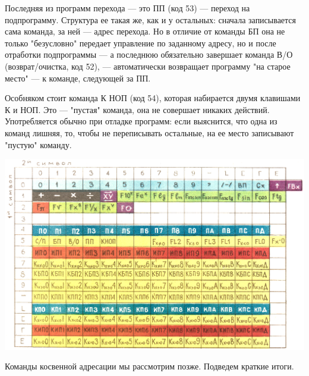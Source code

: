 \documentclass[11pt,a4paper,oneside]{article}
\begin{document}
Последняя из программ перехода — это ПП (код 53) — переход на подпрограмму. Структура ее такая же, как и у остальных: сначала записывается сама команда, за ней — адрес перехода. Но в отличие от команды БП она не только "безусловно" передает управление по заданному адресу, но и после отработки подпрограммы — а последнюю обязательно завершает команда В/О (возврат/очистка, код 52), — автоматически возвращает программу "на старое место" — к команде, следующей за ПП.

Особняком стоит команда К НОП (код 54), которая набирается двумя клавишами К и НОП. Это — "пустая" команда, она не совершает никаких действий. Употребляется обычно при отладке программ: если выяснится, что одна из команд лишняя, то, чтобы не переписывать остальные, на ее место записывают "пустую" команду.

\includegraphics[width=\textwidth]{commands}

Команды косвенной адресации мы рассмотрим позже. Подведем краткие итоги.
\end{document}
